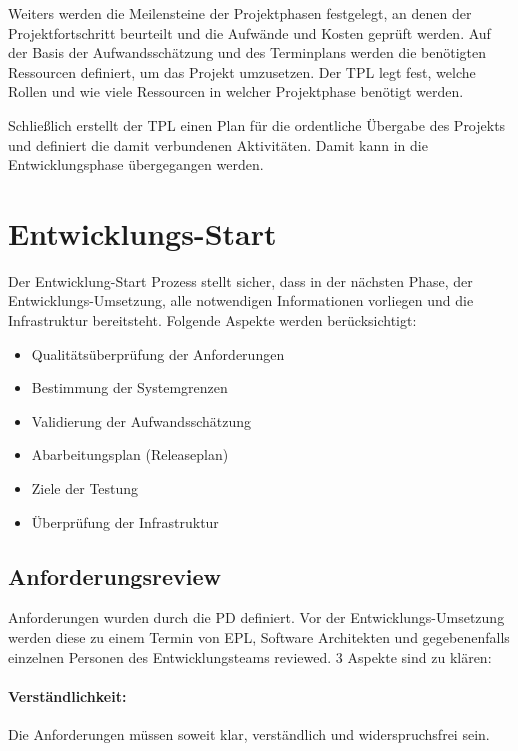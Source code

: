 Weiters werden die Meilensteine der Projektphasen festgelegt, an denen der Projektfortschritt beurteilt und die Aufwände und Kosten geprüft werden. Auf der Basis der Aufwandsschätzung und des Terminplans werden die benötigten Ressourcen definiert, um das Projekt umzusetzen. Der \ac{TPL} legt fest, welche Rollen und wie viele Ressourcen in welcher Projektphase benötigt werden.

Schließlich erstellt der \ac{TPL} einen Plan für die ordentliche Übergabe des Projekts und definiert die damit verbundenen Aktivitäten. Damit kann in die Entwicklungsphase übergegangen werden.

\section{Entwicklungs-Start}

Der Entwicklung-Start Prozess stellt sicher, dass in der nächsten Phase, der Entwicklungs-Umsetzung, alle notwendigen Informationen vorliegen und die Infrastruktur bereitsteht. 
Folgende Aspekte werden berücksichtigt:

\begin{itemize}
    \item Qualitätsüberprüfung der Anforderungen
    \item Bestimmung der Systemgrenzen
    \item Validierung der Aufwandsschätzung
    \item Abarbeitungsplan (Releaseplan)
    \item Ziele der Testung
    \item Überprüfung der Infrastruktur
\end{itemize} 

\subsection{Anforderungsreview}

Anforderungen wurden durch die \ac{PD} definiert. Vor der Entwicklungs-Umsetzung werden diese zu einem Termin von \ac{EPL}, Software Architekten und gegebenenfalls einzelnen Personen des Entwicklungsteams reviewed. 3 Aspekte sind zu klären:

\paragraph{Verständlichkeit:} 
Die Anforderungen müssen soweit klar, verständlich und widerspruchsfrei sein.

